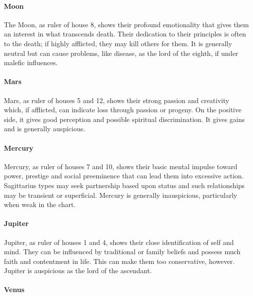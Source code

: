  

\paragraph{Moon}

The Moon, as ruler of house 8, shows their profound emotionality that gives them an interest in what transcends death. Their dedication to their principles is often to the death; if highly afflicted, they may kill others for them. It is generally neutral but can cause problems, like disease, as the lord of the eighth, if under malefic influences.

 

\paragraph{Mars}

Mars, as ruler of houses 5 and 12, shows their strong passion and creativity which, if afflicted, can indicate loss through passion or progeny. On the positive side, it gives good perception and possible spiritual discrimination. It gives gains and is generally auspicious.

 

\paragraph{Mercury}

Mercury, as ruler of houses 7 and 10, shows their basic mental impulse toward power, prestige and social preeminence that can lead them into excessive action. Sagittarius types may seek partnership based upon status and such relationships may be transient or superficial. Mercury is generally inauspicious, particularly when weak in the chart.

 

\paragraph{Jupiter}

Jupiter, as ruler of houses 1 and 4, shows their close identification of self and mind. They can be influenced by traditional or family beliefs and possess much faith and contentment in life. This can make them too conservative, however. Jupiter is auspicious as the lord of the ascendant.

 

\paragraph{Venus}

